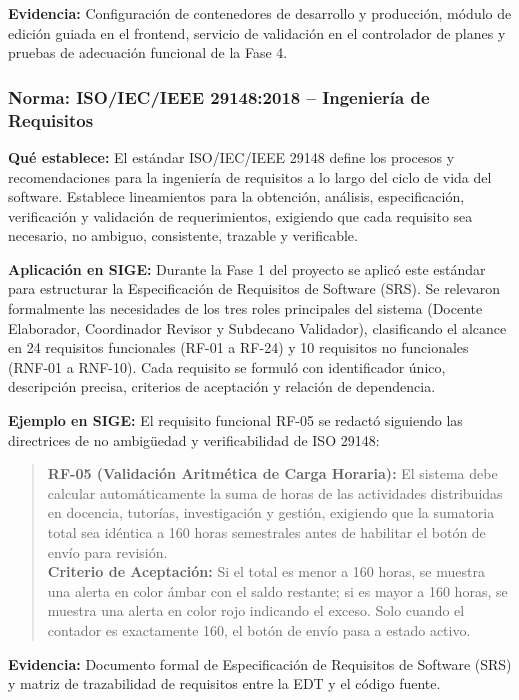\documentclass[12pt,a4paper]{article}
\begin{document}
\textbf{Evidencia:}
Configuración de contenedores de desarrollo y producción, módulo de edición guiada en el frontend, servicio de validación en el controlador de planes y pruebas de adecuación funcional de la Fase 4.

\subsubsection{Norma: ISO/IEC/IEEE 29148:2018 -- Ingeniería de Requisitos}

\textbf{Qué establece:}
El estándar ISO/IEC/IEEE 29148 define los procesos y recomendaciones para la ingeniería de requisitos a lo largo del ciclo de vida del software. Establece lineamientos para la obtención, análisis, especificación, verificación y validación de requerimientos, exigiendo que cada requisito sea necesario, no ambiguo, consistente, trazable y verificable.

\textbf{Aplicación en SIGE:}
Durante la Fase 1 del proyecto se aplicó este estándar para estructurar la Especificación de Requisitos de Software (SRS). Se relevaron formalmente las necesidades de los tres roles principales del sistema (Docente Elaborador, Coordinador Revisor y Subdecano Validador), clasificando el alcance en 24 requisitos funcionales (RF-01 a RF-24) y 10 requisitos no funcionales (RNF-01 a RNF-10). Cada requisito se formuló con identificador único, descripción precisa, criterios de aceptación y relación de dependencia.

\textbf{Ejemplo en SIGE:}
El requisito funcional RF-05 se redactó siguiendo las directrices de no ambigüedad y verificabilidad de ISO 29148:
\begin{quote}
\textbf{RF-05 (Validación Aritmética de Carga Horaria):} El sistema debe calcular automáticamente la suma de horas de las actividades distribuidas en docencia, tutorías, investigación y gestión, exigiendo que la sumatoria total sea idéntica a 160 horas semestrales antes de habilitar el botón de envío para revisión. \\
\textbf{Criterio de Aceptación:} Si el total es menor a 160 horas, se muestra una alerta en color ámbar con el saldo restante; si es mayor a 160 horas, se muestra una alerta en color rojo indicando el exceso. Solo cuando el contador es exactamente 160, el botón de envío pasa a estado activo.
\end{quote}

\textbf{Evidencia:}
Documento formal de Especificación de Requisitos de Software (SRS) y matriz de trazabilidad de requisitos entre la EDT y el código fuente.
\end{document}
